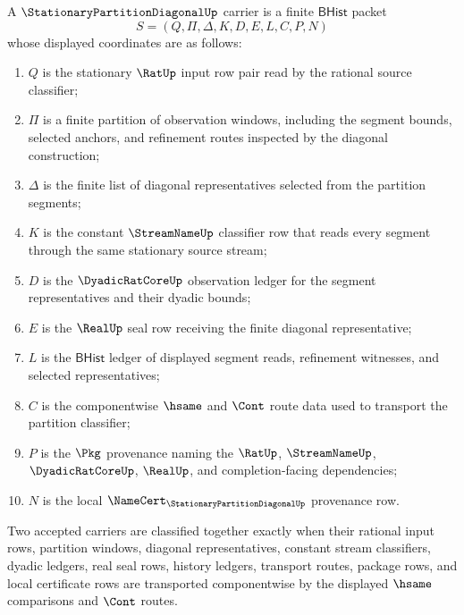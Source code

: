 \begin{definition}
\label{def:stationary-partition-diagonal-carrier}
A $\StationaryPartitionDiagonalUp$ carrier is a finite $\mathsf{BHist}$ packet
$$
S=(Q,\Pi,\Delta,K,D,E,L,C,P,N)
$$
whose displayed coordinates are as follows:
\begin{enumerate}
\item $Q$ is the stationary $\RatUp$ input row pair read by the rational source classifier;
\item $\Pi$ is a finite partition of observation windows, including the segment bounds, selected anchors, and refinement routes inspected by the diagonal construction;
\item $\Delta$ is the finite list of diagonal representatives selected from the partition segments;
\item $K$ is the constant $\StreamNameUp$ classifier row that reads every segment through the same stationary source stream;
\item $D$ is the $\DyadicRatCoreUp$ observation ledger for the segment representatives and their dyadic bounds;
\item $E$ is the $\RealUp$ seal row receiving the finite diagonal representative;
\item $L$ is the $\mathsf{BHist}$ ledger of displayed segment reads, refinement witnesses, and selected representatives;
\item $C$ is the componentwise $\hsame$ and $\Cont$ route data used to transport the partition classifier;
\item $P$ is the $\Pkg$ provenance naming the $\RatUp$, $\StreamNameUp$, $\DyadicRatCoreUp$, $\RealUp$, and completion-facing dependencies;
\item $N$ is the local $\NameCert_{\StationaryPartitionDiagonalUp}$ provenance row.
\end{enumerate}
Two accepted carriers are classified together exactly when their rational input rows, partition windows, diagonal representatives, constant stream classifiers, dyadic ledgers, real seal rows, history ledgers, transport routes, package rows, and local certificate rows are transported componentwise by the displayed $\hsame$ comparisons and $\Cont$ routes.
\end{definition}

